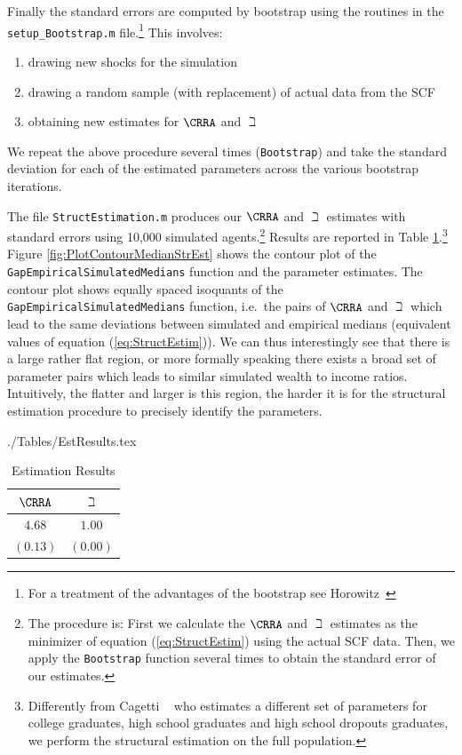 \documentclass[titlepage]{\econtex}
\begin{document}
  Finally the standard errors are computed by bootstrap using the
  routines in the \texttt{setup\_Bootstrap.m} file.\footnote{For a
    treatment of the advantages of the bootstrap see
    Horowitz~\citeyearpar{horowitzBootstrap}} This involves:
  \begin{enumerate}
  \item drawing new shocks for the simulation
  \item drawing a random sample (with replacement) of actual data from the SCF
  \item obtaining new estimates for $\CRRA$ and ${\beth}$
  \end{enumerate}
  We repeat the above procedure several times (\texttt{Bootstrap}) and take the standard deviation for each of the estimated parameters across the various bootstrap iterations.

  The file \texttt{StructEstimation.m} produces our $\CRRA$ and
  ${\beth}$ estimates with standard errors using 10,000 simulated
  agents.\footnote{The procedure is: First we calculate the $\CRRA$ and
    ${\beth}$ estimates as the minimizer of equation
    (\ref{eq:StructEstim}) using the actual SCF data. Then, we apply the
    \texttt{Bootstrap} function several times to obtain the standard
    error of our estimates.} Results are reported in Table
  \ref{tab:EstResults}.\footnote{Differently from Cagetti
    ~\citeyearpar{cagettiWprofiles} who estimates a different set of
    parameters for college graduates, high school graduates and high
    school dropouts graduates, we perform the structural estimation on
    the full population.} Figure \ref{fig:PlotContourMedianStrEst} shows
  the contour plot of the \texttt{GapEmpiricalSimulatedMedians} function
  and the parameter estimates. The contour plot shows equally spaced
  isoquants of the \texttt{GapEmpiricalSimulatedMedians} function,
  i.e.\ the pairs of $\CRRA$ and ${\beth}$ which lead to the same
  deviations between simulated and empirical medians (equivalent values
  of equation (\ref{eq:StructEstim})). We can thus interestingly see
  that there is a large rather flat region, or more formally speaking
  there exists a broad set of parameter pairs which leads to similar
  simulated wealth to income ratios. Intuitively, the flatter and larger
  is this region, the harder it is for the structural estimation
  procedure to precisely identify the parameters.
  \begin{verbatimwrite}{./Tables/EstResults.tex}
    \begin{table}[h]
      \caption{Estimation Results}\label{tab:EstResults}
      \center
      \begin{tabular}{cc}
        \hline
        $\CRRA $ & ${\beth}$\\
        \hline
        $4.68$ & $1.00$\\
        $(0.13)$ & $(0.00)$\\
        \hline
      \end{tabular}
    \end{table}
  \end{verbatimwrite}
  
\end{document}
